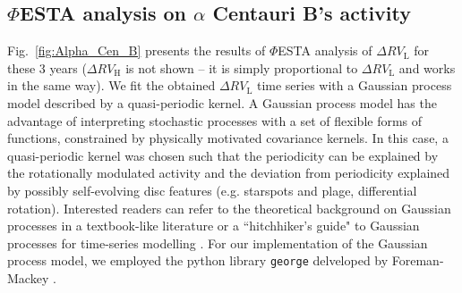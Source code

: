 \subsection{$\mathit{\Phi}$ESTA analysis on $\alpha$ Centauri B's activity}

Fig.~\ref{fig:Alpha_Cen_B} presents the results of $\mathit{\Phi}$ESTA analysis of $\Delta RV_\text{L}$ for these 3 years ($\Delta RV_\text{H}$ is not shown -- it is simply proportional to $\Delta RV_\text{L}$ and works in the same way). We fit the obtained $\Delta RV_\text{L}$ time series with a Gaussian process model described by a quasi-periodic kernel. A Gaussian process model has the advantage of interpreting stochastic processes with a set of flexible forms of functions, constrained by physically motivated covariance kernels. In this case, a quasi-periodic kernel was chosen such that the periodicity can be explained by the rotationally modulated activity and the deviation from periodicity explained by possibly self-evolving disc features (e.g. starspots and plage, differential rotation). Interested readers can refer to the theoretical background on Gaussian processes in a textbook-like literature \cite{Rasmussen2006} or a ``hitchhiker's guide" to Gaussian processes for time-series modelling \cite{Roberts_gaussianprocesses}. For our implementation of the Gaussian process model, we employed the python library \verb|george| delveloped by Foreman-Mackey \cite{Ambikasaran2014}. 

